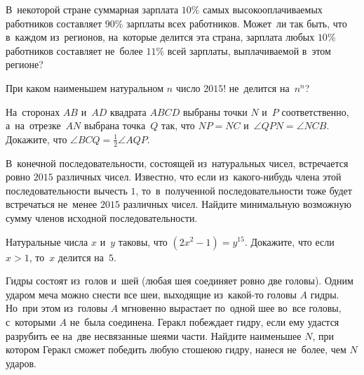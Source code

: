 \begin{problems}

\item
В~некоторой стране суммарная зарплата $10\%$ самых высокооплачиваемых
работников составляет $90\%$ зарплаты всех работников.
Может~ли так быть, что в~каждом из~регионов, на~которые делится эта страна,
зарплата любых $10\%$ работников составляет не~более $11\%$
всей зарплаты, выплачиваемой в~этом регионе?

\item
При каком наименьшем натуральном $n$ число $2015!$ не~делится на~$n^n$?

\item
На~сторонах $AB$ и~$AD$ квадрата $ABCD$ выбраны точки $N$ и~$P$ соответственно,
а~на~отрезке~$AN$ выбрана точка~$Q$ так, что $NP = NC$
и~$\angle QPN = \angle NCB$.
Докажите, что $\angle BCQ = \frac{1}{2} \angle AQP$.

\item
В~конечной последовательности, состоящей из~натуральных чисел, встречается
ровно $2015$ различных чисел.
Известно, что если из~какого-нибудь члена этой последовательности вычесть $1$,
то~в~полученной последовательности тоже будет встречаться не~менее $2015$
различных чисел.
Найдите минимальную возможную сумму членов исходной последовательности.

\item
Натуральные числа $x$ и~$y$ таковы, что $(2 x^2 - 1) = y^{15}$.
Докажите, что если $x > 1$, то~$x$ делится на~$5$.

\end{problems}

\else


\additionalsection

\fi

\ifsecondpart

\begin{problems}

\item
Гидры состоят из~голов и~шей (любая шея соединяет ровно две головы).
Одним ударом меча можно снести все шеи, выходящие из~какой-то головы $A$ гидры.
Но~при этом из~головы $A$ мгновенно вырастает по~одной шее во~все головы,
с~которыми $A$ не~была соединена.
Геракл побеждает гидру, если ему удастся разрубить ее на~две несвязанные шеями
части.
Найдите наименьшее $N$, при котором Геракл сможет победить любую стошеюю гидру,
нанеся не~более, чем $N$ ударов.

\end{problems}

\fi

\endgroup %


